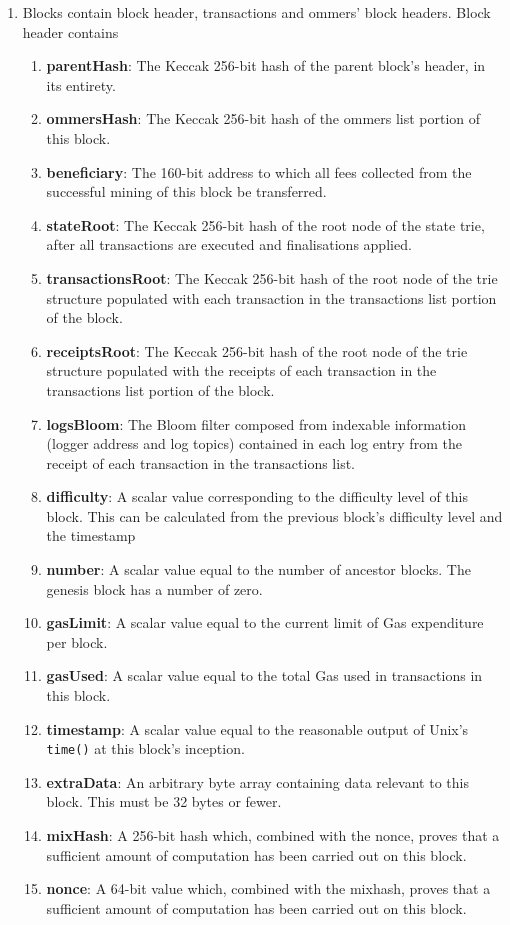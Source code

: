 \begin{enumerate}
\item Blocks contain block header, transactions and ommers' block headers. Block header contains
\begin{enumerate}
\item\textbf{parentHash}: The Keccak 256-bit hash of the parent block's header, in its entirety.
\item\textbf{ommersHash}: The Keccak 256-bit hash of the ommers list portion of this block.
\item\textbf{beneficiary}: The 160-bit address to which all fees collected from the successful mining of this block be transferred.
\item\textbf{stateRoot}: The Keccak 256-bit hash of the root node of the state trie, after all transactions are executed and finalisations applied.
\item\textbf{transactionsRoot}: The Keccak 256-bit hash of the root node of the trie structure populated with each transaction in the transactions list portion of the block.
\item\textbf{receiptsRoot}: The Keccak 256-bit hash of the root node of the trie structure populated with the receipts of each transaction in the transactions list portion of the block.
\item\textbf{logsBloom}: The Bloom filter composed from indexable information (logger address and log topics) contained in each log entry from the receipt of each transaction in the transactions list.
\item\textbf{difficulty}: A scalar value corresponding to the difficulty level of this block. This can be calculated from the previous block's difficulty level and the timestamp
\item\textbf{number}: A scalar value equal to the number of ancestor blocks. The genesis block has a number of zero.
\item\textbf{gasLimit}: A scalar value equal to the current limit of Gas expenditure per block.
\item\textbf{gasUsed}: A scalar value equal to the total Gas used in transactions in this block.
\item\textbf{timestamp}: A scalar value equal to the reasonable output of Unix's \verb|time()| at this block's inception.
\item\textbf{extraData}: An arbitrary byte array containing data relevant to this block. This must be 32 bytes or fewer.
\item\textbf{mixHash}: A 256-bit hash which, combined with the nonce, proves that a sufficient amount of computation has been carried out on this block.
\item\textbf{nonce}: A 64-bit value which, combined with the mixhash, proves that a sufficient amount of computation has been carried out on this block.
\end{enumerate}


\end{enumerate}
